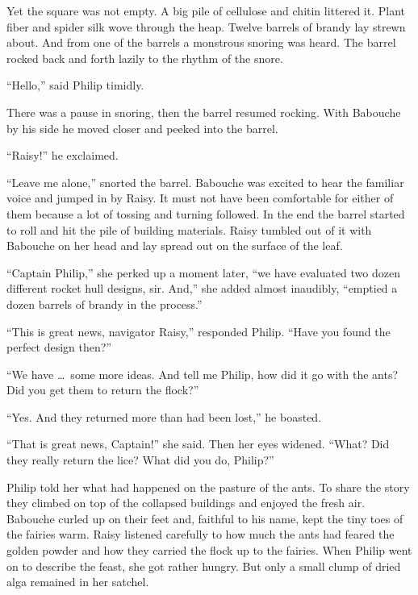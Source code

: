 \documentclass[10pt]{memoir}
\begin{document}
Yet the square was not empty. A big pile of cellulose and chitin littered it.
Plant fiber and spider silk wove through the heap. Twelve barrels of brandy lay
strewn about. And from one of the barrels a monstrous snoring was heard. The
barrel rocked back and forth lazily to the rhythm of the snore.

``Hello,'' said Philip timidly.

There was a pause in snoring, then the barrel resumed rocking. With Babouche by
his side he moved closer and peeked into the barrel.

``Raisy!'' he exclaimed.

``Leave me alone,'' snorted the barrel. Babouche was excited to hear the
familiar voice and jumped in by Raisy. It must not have been comfortable for
either of them because a lot of tossing and turning followed. In the end the
barrel started to roll and hit the pile of building materials. Raisy tumbled
out of it with Babouche on her head and lay spread out on the surface of the
leaf.

``Captain Philip,'' she perked up a moment later, ``we have evaluated two dozen
different rocket hull designs, sir. And,'' she added almost inaudibly,
``emptied a dozen barrels of brandy in the process.''

``This is great news, navigator Raisy,'' responded Philip. ``Have you found the
perfect design then?''

``We have \dots\ some more ideas. And tell me Philip, how did it go with the
ants? Did you get them to return the flock?''

``Yes. And they returned more than had been lost,'' he boasted.

``That is great news, Captain!'' she said. Then her eyes widened. ``What? Did
they really return the lice? What did you do, Philip?''

Philip told her what had happened on the pasture of the ants. To share the
story they climbed on top of the collapsed buildings and enjoyed the fresh air.
Babouche curled up on their feet and, faithful to his name, kept the tiny toes
of the fairies warm. Raisy listened carefully to how much the ants had feared
the golden powder and how they carried the flock up to the fairies. When Philip
went on to describe the feast, she got rather hungry. But only a small clump of
dried alga remained in her satchel.
\end{document}
